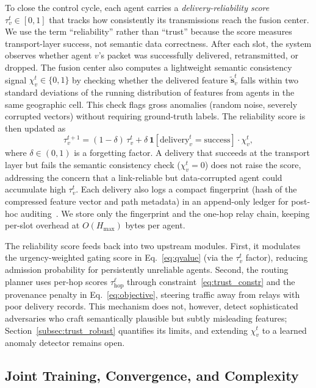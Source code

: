 \documentclass[final,3p,times,review,sort&compress]{elsarticle}
\begin{document}
To close the control cycle, each agent carries a \emph{delivery-reliability score} $\tau_v^t\in[0,1]$ that tracks how consistently its transmissions reach the fusion center. We use the term ``reliability'' rather than ``trust'' because the score measures transport-layer success, not semantic data correctness. After each slot, the system observes whether agent $v$'s packet was successfully delivered, retransmitted, or dropped. The fusion center also computes a lightweight semantic consistency signal $\chi_v^t\in\{0,1\}$ by checking whether the delivered feature $\tilde{\mathbf{s}}_v^t$ falls within two standard deviations of the running distribution of features from agents in the same geographic cell. This check flags gross anomalies (random noise, severely corrupted vectors) without requiring ground-truth labels. The reliability score is then updated as
\begin{equation}
\tau_v^{t+1} = (1-\delta)\,\tau_v^t + \delta\,\mathbf{1}[\text{delivery}_v^t = \text{success}]\cdot\chi_v^t,
\label{eq:trust_update}
\end{equation}
where $\delta\in(0,1)$ is a forgetting factor. A delivery that succeeds at the transport layer but fails the semantic consistency check ($\chi_v^t=0$) does not raise the score, addressing the concern that a link-reliable but data-corrupted agent could accumulate high $\tau_v^t$. Each delivery also logs a compact fingerprint (hash of the compressed feature vector and path metadata) in an append-only ledger for post-hoc auditing~\cite{SARKAR2022100533}. We store only the fingerprint and the one-hop relay chain, keeping per-slot overhead at $O(H_{\max})$ bytes per agent.

The reliability score feeds back into two upstream modules. First, it modulates the urgency-weighted gating score in Eq.~\ref{eq:qvalue} (via the $\tau_v^t$ factor), reducing admission probability for persistently unreliable agents. Second, the routing planner uses per-hop scores $\tau_{\mathrm{hop}}^\ell$ through constraint~\eqref{eq:trust_constr} and the provenance penalty in Eq.~\eqref{eq:objective}, steering traffic away from relays with poor delivery records. This mechanism does not, however, detect sophisticated adversaries who craft semantically plausible but subtly misleading features; Section~\ref{subsec:trust_robust} quantifies its limits, and extending $\chi_v^t$ to a learned anomaly detector remains open.

\subsection{Joint Training, Convergence, and Complexity}
\label{subsec:training}
\end{document}
